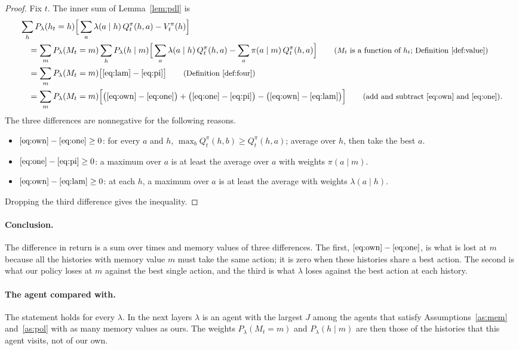 \documentclass{article}
\theoremstyle{definition}
\numberwithin{equation}{section}
\newcommand{\why}[1]{\tag*{\small(#1)}}
\begin{document}
\begin{proof}
Fix $t$. The inner sum of Lemma~\ref{lem:pdl} is
\begin{align*}
&\sum_hP_\lambda(h_t=h)\Big[\sum_a\lambda(a\mid h)\,Q^\pi_t(h,a)-V^\pi_t(h)\Big]\\
&\quad=\sum_mP_\lambda(M_t=m)\sum_hP_\lambda(h\mid m)\Big[\sum_a\lambda(a\mid h)\,Q^\pi_t(h,a)-\sum_a\pi(a\mid m)\,Q^\pi_t(h,a)\Big] \why{$M_t$ is a function of $h_t$; Definition~\ref{def:value}}\\
&\quad=\sum_mP_\lambda(M_t=m)\big[\eqref{eq:lam}-\eqref{eq:pi}\big] \why{Definition~\ref{def:four}}\\
&\quad=\sum_mP_\lambda(M_t=m)\Big[\big(\eqref{eq:own}-\eqref{eq:one}\big)+\big(\eqref{eq:one}-\eqref{eq:pi}\big)-\big(\eqref{eq:own}-\eqref{eq:lam}\big)\Big] \why{add and subtract \eqref{eq:own} and \eqref{eq:one}}.
\end{align*}
The three differences are nonnegative for the following reasons.
\begin{itemize}
\item $\eqref{eq:own}-\eqref{eq:one}\ge0$: for every $a$ and $h$, $\max_bQ^\pi_t(h,b)\ge Q^\pi_t(h,a)$; average over $h$, then take the best $a$.
\item $\eqref{eq:one}-\eqref{eq:pi}\ge0$: a maximum over $a$ is at least the average over $a$ with weights $\pi(a\mid m)$.
\item $\eqref{eq:own}-\eqref{eq:lam}\ge0$: at each $h$, a maximum over $a$ is at least the average with weights $\lambda(a\mid h)$.
\end{itemize}
Dropping the third difference gives the inequality.
\end{proof}

\paragraph{Conclusion.} The difference in return is a sum over times and memory values of three differences. The first, $\eqref{eq:own}-\eqref{eq:one}$, is what is lost at $m$ because all the histories with memory value $m$ must take the same action; it is zero when these histories share a best action. The second is what our policy loses at $m$ against the best single action, and the third is what $\lambda$ loses against the best action at each history.

\paragraph{The agent compared with.} The statement holds for every $\lambda$. In the next layers $\lambda$ is an agent with the largest $J$ among the agents that satisfy Assumptions~\ref{as:mem} and~\ref{as:pol} with as many memory values as ours. The weights $P_\lambda(M_t=m)$ and $P_\lambda(h\mid m)$ are then those of the histories that this agent visits, not of our own.
\end{document}
